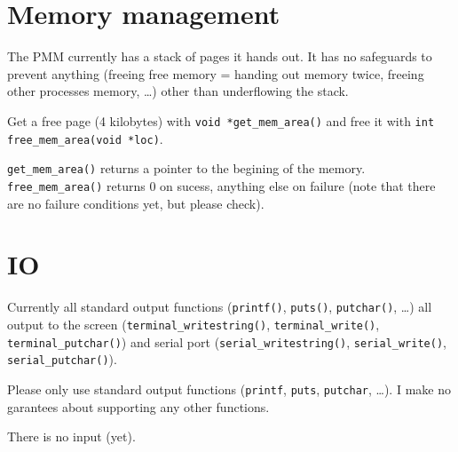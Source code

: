 \documentclass[12pt]{article}
\newcommand{\code}[1]{\colorbox{light-gray}{\texttt{#1}}}
\begin{document}
\section{Memory management}
\begin{list}{}{}
\item The PMM currently has a stack of pages it hands out. It has no safeguards to prevent anything (freeing free memory = handing out memory twice, freeing other processes memory, \ldots) other than underflowing the stack.
\item Get a free page (4 kilobytes) with \code{void *get\_mem\_area()} and free it with \code{int free\_mem\_area(void *loc)}.
\item \code{get\_mem\_area()} returns a pointer to the begining of the memory. \code{free\_mem\_area()} returns 0 on sucess, anything else on failure (note that there are no failure conditions yet, but please check).
\end{list}

\section{IO}
\begin{list}{}{}
\item Currently all standard output functions (\code{printf()}, \code{puts()}, \code{putchar()}, \ldots) all output to the screen (\code{terminal\_writestring()}, \code{terminal\_write()}, \code{terminal\_putchar()}) and serial port (\code{serial\_writestring()}, \code{serial\_write()}, \code{serial\_putchar()}).\linebreak
\begin{list}{}{}
\item Please only use standard output functions (\code{printf}, \code{puts}, \code{putchar}, \ldots). I make no garantees about supporting any other functions.
\end{list}
\item There is no input (yet).
\end{list}
\end{document}

